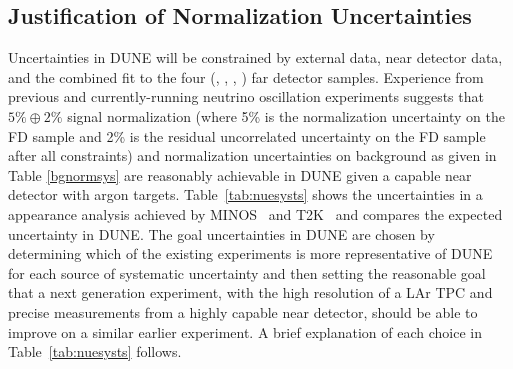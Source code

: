 
\subsection{Justification of Normalization Uncertainties}
\label{sec:syst_just}
Uncertainties in DUNE
will be constrained by external data, near detector data, and the combined
fit to the four (\nue, \anue, \numu, \anumu) far detector samples.  
Experience from previous and currently-running neutrino oscillation 
experiments suggests that $5\% \oplus 2\%$
signal normalization (where 5\% is the normalization uncertainty on the
FD \numu sample and 2\% is the residual uncorrelated uncertainty on the
FD \nue sample after all constraints) and normalization uncertainties on
background as given in Table \ref{bgnormsys}
are reasonably achievable in DUNE given a capable near detector with argon targets.
Table~\ref{tab:nuesysts} shows the uncertainties in a \nue appearance
analysis achieved by MINOS~\cite{Adamson:2013ue} 
and T2K~\cite{Abe:2015awa} and compares the 
expected uncertainty in
DUNE. The goal uncertainties in DUNE are chosen by determining which
of the existing experiments is more representative of DUNE for each source
of systematic uncertainty and then setting the reasonable goal that a next
generation experiment, with the high resolution of a LAr TPC and precise measurements
from a highly capable near detector, should be able to improve on a similar earlier experiment.
A brief explanation of each choice in Table~\ref{tab:nuesysts} follows.
